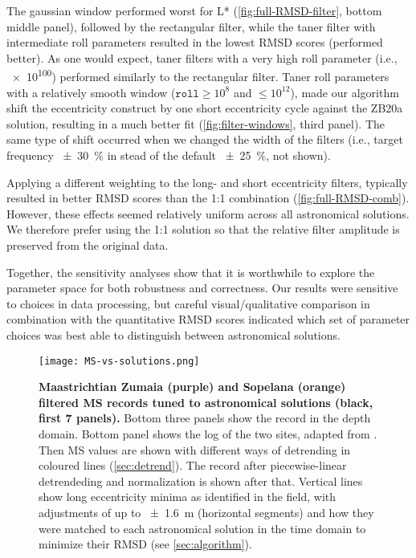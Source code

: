 \documentclass[draft]{agujournal2019}
\begin{document}
The gaussian window performed worst for \gls{L*} (\cref{fig:full-RMSD-filter}, bottom middle panel),
followed by the rectangular filter,
while the taner filter with intermediate roll parameters resulted in the lowest \gls{RMSD} scores (performed better).
As one would expect, taner filters with a very high roll parameter (i.e., \num{e100}) performed similarly to the rectangular filter.
Taner roll parameters with a relatively smooth window (\(\texttt{roll} \ge 10^{8}\) and \(\le 10^{12}\)), made our algorithm shift the eccentricity construct by one short eccentricity cycle against the ZB20a solution, resulting in a much better fit (\cref{fig:filter-windows}, third panel).
The same type of shift occurred when we changed the width of the filters (i.e., target frequency \qty{\pm30}{\percent} in stead of the default \qty{\pm25}{\percent}, not shown).

Applying a different weighting to the long- and short eccentricity filters, typically resulted in better \gls{RMSD} scores than the 1:1 combination (\cref{fig:full-RMSD-comb}).
However, these effects seemed relatively uniform across all astronomical solutions.
We therefore prefer using the 1:1 solution so that the relative filter amplitude is preserved from the original data.

Together, the sensitivity analyses show that it is worthwhile to explore the parameter space for both robustness and correctness.
Our results were sensitive to choices in data processing, but careful visual/qualitative comparison in combination with the quantitative \gls{RMSD} scores indicated which set of parameter choices was best able to distinguish between astronomical solutions.

\begin{figure}
  \centering
  \texttt{[image: MS-vs-solutions.png]}
  \caption{\label{fig:rolling-age-MS}
    \textbf{Maastrichtian Zumaia (purple) and Sopelana (orange) filtered \gls{MS} records tuned to astronomical solutions (black, first 7 panels).}
    Bottom three panels show the record in the depth domain.
    Bottom panel shows the log of the two sites, adapted from .
    Then \gls{MS} values are shown with different ways of detrending in coloured lines (\cref{sec:detrend}).
    The record after piecewise-linear detrendeding and normalization is shown after that.
    Vertical lines show long eccentricity minima as identified in the field,
    with adjustments of up to \qty{\pm1.6}{\metre} (horizontal segments)
    and how they were matched to each astronomical solution in the time domain to minimize their \gls{RMSD} (see \cref{sec:algorithm}).
    }
\end{figure}
\end{document}
